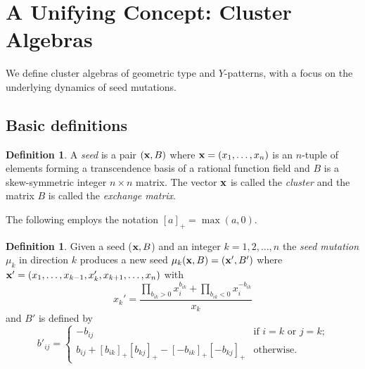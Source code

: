 \documentclass{amsart}
\theoremstyle{definition}
\newtheorem{definition}[theorem]{Definition}
\newtheorem{example}[theorem]{Example}
\newtheorem{exercise}[theorem]{Exercise}
\theoremstyle{remark}
\numberwithin{equation}{section}
\newcommand{\x}{{\bf x}}
\begin{document}


\section{A Unifying Concept: Cluster Algebras}\label{sec:cluster_algebras}
	We define cluster algebras of geometric type and $Y$-patterns, with a focus on the underlying dynamics of seed mutations.
	
	\subsection{Basic definitions}

	\begin{definition}
		A \emph{seed} is a pair $(\x,B)$ where $\x = (x_1,\ldots, x_n)$ is an $n$-tuple of elements forming a transcendence basis of a rational function field and $B$ is a skew-symmetric integer $n \times n$ matrix.  The vector $\x$ is called the \emph{cluster} and the matrix $B$ is called the \emph{exchange matrix}.
	\end{definition}
  
	The following employs the notation $[a]_+ = \max(a,0)$.
	\begin{definition}
		Given a seed ($\x,B$) and an integer $k=1,2,\ldots, n$ the \emph{seed mutation} $\mu_k$ in direction $k$ produces a new seed $\mu_k(\x,B) = (\x',B')$ where $\x' = (x_1,\ldots, x_{k-1}, x_k', x_{k+1},\ldots, x_n)$ with 
		\begin{equation} \label{eq:exchange relation}
		x_k' = \frac{\prod_{b_{ik}>0} x_i^{b_{ik}} + \prod_{b_{ik}<0} x_i^{-b_{ik}}}{x_k}
		\end{equation}
		and $B'$ is defined by
		\begin{equation}\label{eq:matrix mutation}
      b'_{ij}=\begin{cases}
                 -b_{ij} & \text{if $i=k$ or $j=k$;}\\
                 b_{ij}+[b_{ik}]_+[b_{kj}]_+-[-b_{ik}]_+[-b_{kj}]_+ & \text{otherwise.}
               \end{cases}
    \end{equation}
	\end{definition}
		
\end{document}

